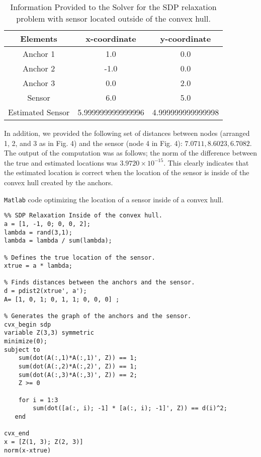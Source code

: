 \documentclass[12pt,letterpaper]{article}
\begin{document}
\begin{table}[h]
\begin{center}
\caption{Information Provided to the Solver for the SDP relaxation problem with sensor located outside of the convex hull.}
\vspace{.3cm}
\label{my-label}
\begin{tabular}{|c|c|c|}
\hline
        Elements  & x-coordinate & y-coordinate \\ \hline
               Anchor 1  &  1.0 &  0.0\\ 
       Anchor 2  &  -1.0 &  0.0\\ 
       Anchor 3  &  0.0 &  2.0\\ 
       Sensor  &   6.0 & 5.0 \\ 
       Estimated Sensor  &  5.999999999999996 &  4.999999999999998\\ \hline
       
\hline
\end{tabular}
\end{center}
\end{table}


In addition, we provided the following set of distances between nodes (arranged 1, 2, and 3 as in Fig. 4) and the sensor (node 4 in Fig. 4): $7.0711, 8.6023, 6.7082$. The output of the computation was as follows; the norm of the difference between the true and estimated locations was $3.9720\times10^{-15}$. This clearly indicates that the estimated location is correct when the location of the sensor is inside of the convex hull created by the anchors. 

\newpage
\begin{center}
\texttt{Matlab} code optimizing the location of a sensor inside of a convex hull.  
\end{center}
\begin{lstlisting}
%% SDP Relaxation Inside of the convex hull.
a = [1, -1, 0; 0, 0, 2];
lambda = rand(3,1);
lambda = lambda / sum(lambda);

% Defines the true location of the sensor.
xtrue = a * lambda; 

% Finds distances between the anchors and the sensor.
d = pdist2(xtrue', a');
A= [1, 0, 1; 0, 1, 1; 0, 0, 0] ;

% Generates the graph of the anchors and the sensor.
cvx_begin sdp
variable Z(3,3) symmetric
minimize(0);
subject to
	sum(dot(A(:,1)*A(:,1)', Z)) == 1;
	sum(dot(A(:,2)*A(:,2)', Z)) == 1;
	sum(dot(A(:,3)*A(:,3)', Z)) == 2;
	Z >= 0
	
	for i = 1:3
        sum(dot([a(:, i); -1] * [a(:, i); -1]', Z)) == d(i)^2;
   end
   
cvx_end
x = [Z(1, 3); Z(2, 3)]
norm(x-xtrue)
\end{lstlisting}
\end{document}
